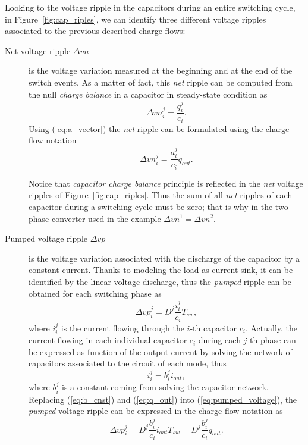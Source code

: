 Looking to the voltage ripple in the capacitors during an entire switching cycle, in Figure~\ref{fig:cap_riples}, we can identify three different voltage ripples associated to the previous described charge flows:
\begin{description}
  \item[Net voltage ripple $\Delta vn$] is the voltage variation measured at the beginning and at the end of the switch events. As a matter of fact, this \emph{net} ripple can be computed from the null \emph{charge balance} in a capacitor in steady-state condition as
      \begin{equation}
        \Delta {vn}^j_i  = \frac{q_i ^j }{c_i}.
        \label{eq:net_voltage}
      \end{equation}
      Using (\ref{eq:a_vector}) the \emph{net} ripple can be formulated using the charge flow notation
      \begin{equation}
        \Delta {vn}^j_i  = \frac{a_i ^j }{c_i} {q_{out}}.
        \label{eq:net_voltage_cf}
      \end{equation}

      Notice that \emph{capacitor charge balance} principle is reflected in the \emph{net }voltage ripples of Figure~\ref{fig:cap_riples}. Thus the sum of all \emph{net} ripples of each capacitor during a switching cycle  must be zero; that is why in the two phase converter used in the example $\Delta vn^1 = \Delta vn^2$.

  \item[Pumped voltage ripple $\Delta vp$] is the voltage variation associated with the discharge of the capacitor by a constant current. Thanks to modeling the load as current sink, it can be identified by the linear voltage discharge, thus the \emph{pumped} ripple can be obtained for each switching phase as
      \begin{equation}
        \Delta {vp}^j_i  = D^j \frac{i_i^j}{c_i }T_{sw},
      \label{eq:pumped_voltage}
      \end{equation}
      where $i_i^j$ is the current flowing through the $i$-th capacitor $c_i$. Actually, the current flowing in each individual capacitor $c_i$ during each $j$-th phase can be expressed as function of the output current by solving the network of capacitors associated to the circuit of each mode, thus
      \begin{equation}
        i_i^j = b_i^j i_{out} ,
      \label{eq:b_cnst}
      \end{equation}
      where $ b_i^j $ is a constant coming from solving the capacitor network.  Replacing (\ref{eq:b_cnst}) and (\ref{eq:q_out}) into (\ref{eq:pumped_voltage}), the \emph{pumped} voltage ripple can be expressed in the charge flow notation as
      \begin{equation}
        \Delta {vp}^j_i  = D^j \frac{b_i^j}{c_i } {i_{out}} {T_{sw}} = D^j \frac{b_i^j}{c_i } {q_{out}}.
      \label{eq:pumped_voltage_cf}
      \end{equation}


\end{description}
